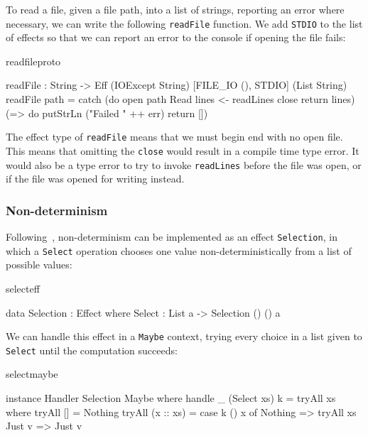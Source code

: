 \noindent
To read a file, given a file path, into a list of strings, reporting an
error where necessary, we can write the following \texttt{readFile}
function. We add \texttt{STDIO} to the list of effects so that we can report
an error to the console if opening the file fails:

\noindent
\begin{SaveVerbatim}{readfileproto}

 readFile : String -> Eff (IOExcept String)
                [FILE_IO (), STDIO] (List String)
 readFile path = catch (do open path Read
                           lines <- readLines
                           close
                           return lines)
         (\err => do putStrLn ("Failed " ++ err)
                     return [])

\end{SaveVerbatim}

\noindent
The effect type of \texttt{readFile} means that we must begin  end
with no open file. This means that omitting the \texttt{close} would result in
a compile time type error. It would also be a type error to try to invoke
\texttt{readLines} before the file was open, or if the file was opened for
writing instead.

\subsubsection{Non-determinism}

Following~\cite{Bauer},
non-determinism can be implemented as an effect \texttt{Selection},
in which a \texttt{Select} operation chooses one value non-deterministically
from a list of possible values:

\begin{SaveVerbatim}{selecteff}

data Selection : Effect where
     Select : List a -> Selection () () a

\end{SaveVerbatim}

\noindent
We can handle this effect in a \texttt{Maybe} context, trying every choice
in a list given to \texttt{Select} until the computation succeeds:

\begin{SaveVerbatim}{selectmaybe}

instance Handler Selection Maybe where
     handle _ (Select xs) k = tryAll xs where
         tryAll [] = Nothing
         tryAll (x :: xs) = case k () x of
                                 Nothing => tryAll xs
                                 Just v => Just v

\end{SaveVerbatim}

